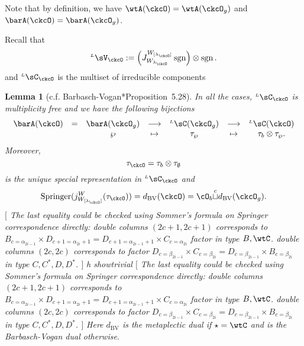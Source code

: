 \documentclass[12pt,a4paper]{amsart}
\newcommand{\trivial}[2][]{\if\relax\detokenize{#1}\relax
  {%
      \color{orange} \vspace{0em} $[$  #2 $]$
      \color{black}
  }
  \else
\ifx#1h
\ifcsname showtrivial\endcsname
{%
    \color{orange} \vspace{0em}  $[$ #2 $]$
    \color{black}
}
\fi
\else {\red Wrong argument!} \fi
\fi
}
\newcommand{\sgn}{\operatorname{sgn}}
\numberwithin{equation}{section}
\newtheorem{lem}[thm]{Lemma}
\theoremstyle{remark}
\def\dBV{d_{\mathrm{BV}}}
\def\lamck{\lambda_\ckcO}
\def\WLamck{W_{[\lambda_{\ckcO}]}}
\def\Wlamck{W_{\lamck}}
\def\LC{{}^{\scriptscriptstyle L}\sC}
\def\LV{{}^{\scriptscriptstyle L}\sV}
\def\cupcol{{\stackrel{c}{\sqcup}}}
\def\Spr{\mathrm{Springer}}
\begin{document}
  Note that by definition, we have $\wtA(\ckcO)=\wtA(\ckcO_{g})$ and
  $\barA(\ckcO)=\barA(\ckcO_{g})$.

  Recall that
  \[
    \LV_{\ckcO}:= \left(J_{\Wlamck}^{\WLamck} \sgn\right) \otimes \sgn.
  \]
  and $\LC_{\ckcO}$ is the multiset of irreducible components

  \begin{lem}[c.f. Barbasch-Vogan{\cite{BVUni}*{Proposition~5.28}}]
    \label{lem:Lcell}
    In all the cases, $\LC_{\ckcO}$ is multiplicity free and we have the
    following bijections
    \[
      \begin{array}{lccccccc}
        \barA(\ckcO)&=&\barA(\ckcO_{g}) & \longrightarrow & \LC(\ckcO_{g})
        & \longrightarrow & \LC(\ckcO)\\
                    &  &\wp & \mapsto & \tau_{\wp} &
                                                     \mapsto & \tau_{b}\otimes \tau_{\wp}.
      \end{array}
    \]
    Moreover,
    \[
      \tau_{\ckcO}=\tau_{b}\otimes \tau_{\emptyset}
    \] is the unique special representation in $\LC_{\ckcO}$ and
    \begin{equation}\label{eq:dBV.W}
      \Spr(j_{\WLamck}^{W}(\tau_{\ckcO})) = \dBV(\ckcO) = \cO_{b}\cupcol \dBV(\ckcO_{g}).
    \end{equation}
    \trivial[]{ The last equality could be checked using Sommer's formula on
      Springer correspondence directly: double columns $(2c+1,2c+1)$ corresponds
      to
      $ B_{c=\alpha_{2i-1}}\times D_{c+1=\alpha_{2i}+1}=D_{c+1=\alpha_{2i-1}+1}\times C_{c=\alpha_{2i}}$
      factor in type $B,\wtC$. double columns $(2c,2c)$ corresponds to factor
      $D_{c=\beta_{2i-1}}\times C_{c=\beta_{2i}}=D_{c=\beta_{2i-1}}\times B_{c=\beta_{2i}}$
      in type $C,C^{*},D,D^{*}$. } Here $\dBV$ is the metaplectic dual if
    $\star=\wtC$ and is the Barbasch-Vogan dual otherwise.
  \end{lem}
\end{document}
